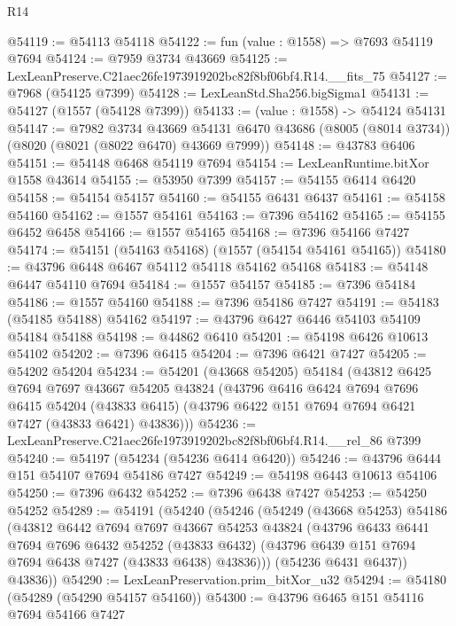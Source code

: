 \begin{lexlean}{R14}
\begin{coremodule}
@54119 := @54113 @54118
@54122 := fun (value : @1558) => @7693 @54119 @7694
@54124 := @7959 @3734 @43669
@54125 := LexLeanPreserve.C21aec26fe1973919202bc82f8bf06bf4.R14.__fits_75
@54127 := @7968 (@54125 @7399)
@54128 := LexLeanStd.Sha256.bigSigma1
@54131 := @54127 (@1557 (@54128 @7399))
@54133 := (value : @1558) -> @54124 @54131
@54147 := @7982
    @3734
    @43669
    @54131
    @6470
    @43686
    (@8005 (@8014 @3734))
    (@8020 (@8021 (@8022 @6470) @43669 @7999))
@54148 := @43783 @6406
@54151 := @54148 @6468 @54119 @7694
@54154 := LexLeanRuntime.bitXor @1558 @43614
@54155 := @53950 @7399
@54157 := @54155 @6414 @6420
@54158 := @54154 @54157
@54160 := @54155 @6431 @6437
@54161 := @54158 @54160
@54162 := @1557 @54161
@54163 := @7396 @54162
@54165 := @54155 @6452 @6458
@54166 := @1557 @54165
@54168 := @7396 @54166 @7427
@54174 := @54151 (@54163 @54168) (@1557 (@54154 @54161 @54165))
@54180 := @43796 @6448 @6467 @54112 @54118 @54162 @54168
@54183 := @54148 @6447 @54110 @7694
@54184 := @1557 @54157
@54185 := @7396 @54184
@54186 := @1557 @54160
@54188 := @7396 @54186 @7427
@54191 := @54183 (@54185 @54188) @54162
@54197 := @43796 @6427 @6446 @54103 @54109 @54184 @54188
@54198 := @44862 @6410
@54201 := @54198 @6426 @10613 @54102
@54202 := @7396 @6415
@54204 := @7396 @6421 @7427
@54205 := @54202 @54204
@54234 := @54201
    (@43668 @54205)
    @54184
    (@43812
      @6425
      @7694
      @7697
      @43667
      @54205
      @43824
      (@43796
        @6416
        @6424
        @7694
        @7696
        @6415
        @54204
        (@43833 @6415)
        (@43796 @6422 @151 @7694 @7694 @6421 @7427 (@43833 @6421) @43836)))
@54236 := LexLeanPreserve.C21aec26fe1973919202bc82f8bf06bf4.R14.__rel_86 @7399
@54240 := @54197 (@54234 (@54236 @6414 @6420))
@54246 := @43796 @6444 @151 @54107 @7694 @54186 @7427
@54249 := @54198 @6443 @10613 @54106
@54250 := @7396 @6432
@54252 := @7396 @6438 @7427
@54253 := @54250 @54252
@54289 := @54191
    (@54240
      (@54246
        (@54249
          (@43668 @54253)
          @54186
          (@43812
            @6442
            @7694
            @7697
            @43667
            @54253
            @43824
            (@43796
              @6433
              @6441
              @7694
              @7696
              @6432
              @54252
              (@43833 @6432)
              (@43796 @6439 @151 @7694 @7694 @6438 @7427 (@43833 @6438) @43836)))
          (@54236 @6431 @6437))
        @43836))
@54290 := LexLeanPreservation.prim_bitXor_u32
@54294 := @54180 (@54289 (@54290 @54157 @54160))
@54300 := @43796 @6465 @151 @54116 @7694 @54166 @7427

\end{coremodule}
\end{lexlean}
